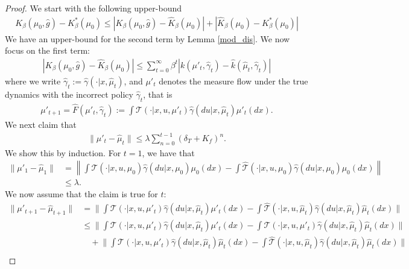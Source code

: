 \documentclass[twoside,11pt]{article}
\begin{document}
\begin{proof}
We start with the following upper-bound
\begin{align}\label{init_bound}
K_\beta(\mu_0,\hat{g}) - K_\beta^*(\mu_0)\leq \left| K_\beta(\mu_0,\hat{g})  - \hat{K}_\beta(\mu_0)\right| + \left|\hat{K}_\beta(\mu_0) -  K_\beta^*(\mu_0)\right|
\end{align}
We have an upper-bound for the second term by Lemma \ref{mod_dis}. We now focus on the first term:
\begin{align*}
 \left| K_\beta(\mu_0,\hat{g})  - \hat{K}_\beta(\mu_0)\right| \leq \sum_{t=0}^\infty \beta^t \left| k(\mu'_t,\hat{\gamma}_t) - \hat{k}(\hat{\mu}_t,\hat{\gamma}_t) \right|
\end{align*}
where we write $\hat{\gamma}_t:=\hat{\gamma}(\cdot|x,\hat{\mu}_t)$, and $\mu'_t$ denotes the measure flow under the true dynamics with the incorrect policy $\hat{\gamma}_t$, that is 
\begin{align*}
\mu'_{t+1} = \hat{F}(\mu'_t,\hat{\gamma}_t) := \int {\mathcal{T}}(\cdot|x,u,\mu'_t) \hat{\gamma}(du|x,\hat{\mu}_t) \mu'_t(dx).
\end{align*}
We next claim that
\begin{align*}
\|\mu'_{t} - \hat{\mu}_t\| \leq \lambda \sum_{n=0}^{t-1} (\delta_T + K_f)^n.
\end{align*}
We show this by induction. For $t=1$, we have that
\begin{align*}
\|\mu'_{1} - \hat{\mu}_1\| &= \left\|\int  {\mathcal{T}}(\cdot|x,u,\mu_0) \hat{\gamma}(du|x, {\mu}_0) \mu_0(dx) -  \int \hat{\mathcal{T}}(\cdot|x,u,\mu_0) \hat{\gamma}(du|x,{\mu}_0) \mu_0(dx)\right\|\\
&\leq \lambda.
\end{align*}
We now assume that the claim is true for $t$:
\begin{align*}
\|\mu'_{t+1} - \hat{\mu}_{t+1}\| &= \bigg\|  \int {\mathcal{T}}(\cdot|x,u,\mu'_t) \hat{\gamma}(du|x,\hat{\mu}_t) \mu'_t(dx) -  \int \hat{\mathcal{T}}(\cdot|x,u,\hat{\mu}_t) \hat{\gamma}(du|x,\hat{\mu}_t) \hat{\mu}_t(dx)\bigg\|\\
&\leq \bigg\|  \int {\mathcal{T}}(\cdot|x,u,\mu'_t) \hat{\gamma}(du|x,\hat{\mu}_t) \mu'_t(dx) -  \int {\mathcal{T}}(\cdot|x,u,{\mu}'_t) \hat{\gamma}(du|x,\hat{\mu}_t) \hat{\mu}_t(dx)\bigg\|\\
& \quad + \bigg\|  \int {\mathcal{T}}(\cdot|x,u,\mu'_t) \hat{\gamma}(du|x,\hat{\mu}_t) \hat{\mu}_t(dx) -  \int \hat{\mathcal{T}}(\cdot|x,u,\hat{\mu}_t) \hat{\gamma}(du|x,\hat{\mu}_t) \hat{\mu}_t(dx)\bigg\|\\

\end{align*}
\end{proof}
\end{document}
